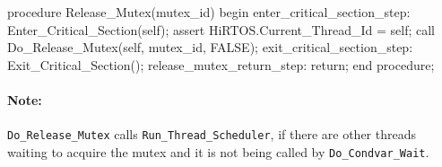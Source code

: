 \documentclass[sigplan,anonymous,10pt]{acmart}
\begin{document}
\begin{ppcal}
procedure Release_Mutex(mutex_id)
begin
   enter_critical_section_step:
   Enter_Critical_Section(self);
   assert HiRTOS.Current_Thread_Id = self;
   call Do_Release_Mutex(self, mutex_id, FALSE);
   exit_critical_section_step:
   Exit_Critical_Section();
   release_mutex_return_step:
   return;
end procedure;
\end{ppcal}
\begin{tlatex}
%
\@x{ {\p@begin}}%
%
%
%
%
%
%
\@x{ {\p@end} {\p@procedure} {\p@semicolon}}%
\end{tlatex}

\paragraph{Note:} \verb'Do_Release_Mutex' calls \verb'Run_Thread_Scheduler',
if there are other threads waiting to acquire the mutex and it is not being
called by \verb'Do_Condvar_Wait'.
\end{document}
